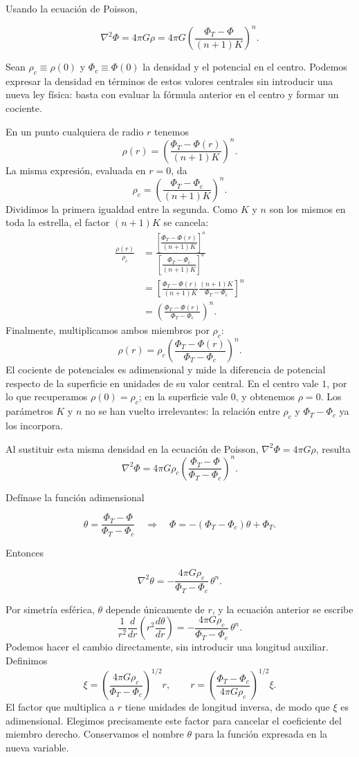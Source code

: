 Usando la ecuación de Poisson,

$$ \nabla^2\Phi = 4\pi G\rho = 4\pi G\left(\frac{\Phi_T - \Phi}{(n+1)K}\right)^n. $$

Sean $\rho_c\equiv\rho(0)$ y $\Phi_c\equiv\Phi(0)$ la densidad y el potencial en el centro. Podemos expresar la densidad en términos de estos valores centrales sin introducir una nueva ley física: basta con evaluar la fórmula anterior en el centro y formar un cociente.

En un punto cualquiera de radio $r$ tenemos
$$
\rho(r)=\left(\frac{\Phi_T-\Phi(r)}{(n+1)K}\right)^n.
$$
La misma expresión, evaluada en $r=0$, da
$$
\rho_c=\left(\frac{\Phi_T-\Phi_c}{(n+1)K}\right)^n.
$$
Dividimos la primera igualdad entre la segunda. Como $K$ y $n$ son los mismos en toda la estrella, el factor $(n+1)K$ se cancela:
$$
\begin{aligned}
\frac{\rho(r)}{\rho_c}
&=\frac{\left[\dfrac{\Phi_T-\Phi(r)}{(n+1)K}\right]^n}
{\left[\dfrac{\Phi_T-\Phi_c}{(n+1)K}\right]^n}\\
&=\left[
\frac{\Phi_T-\Phi(r)}{(n+1)K}
\frac{(n+1)K}{\Phi_T-\Phi_c}
\right]^n\\
&=\left(\frac{\Phi_T-\Phi(r)}{\Phi_T-\Phi_c}\right)^n.
\end{aligned}
$$
Finalmente, multiplicamos ambos miembros por $\rho_c$:
$$
\boxed{\rho(r)=\rho_c
\left(\frac{\Phi_T-\Phi(r)}{\Phi_T-\Phi_c}\right)^n}.
$$
El cociente de potenciales es adimensional y mide la diferencia de potencial respecto de la superficie en unidades de su valor central. En el centro vale $1$, por lo que recuperamos $\rho(0)=\rho_c$; en la superficie vale $0$, y obtenemos $\rho=0$. Los parámetros $K$ y $n$ no se han vuelto irrelevantes: la relación entre $\rho_c$ y $\Phi_T-\Phi_c$ ya los incorpora.

Al sustituir esta misma densidad en la ecuación de Poisson, $\nabla^2\Phi=4\pi G\rho$, resulta
$$
\nabla^2\Phi=4\pi G\rho_c
\left(\frac{\Phi_T-\Phi}{\Phi_T-\Phi_c}\right)^n.
$$

Defínase la función adimensional

$$ \theta = \frac{\Phi_T - \Phi}{\Phi_T - \Phi_c} \quad\Rightarrow\quad \Phi = -(\Phi_T - \Phi_c)\theta + \Phi_T. $$

Entonces

$$ \nabla^2\theta = -\frac{4\pi G\rho_c}{\Phi_T - \Phi_c}\,\theta^n. $$

Por simetría esférica, $\theta$ depende únicamente de $r$, y la ecuación anterior se escribe
$$
\frac{1}{r^2}\frac{d}{dr}\left(r^2\frac{d\theta}{dr}\right)
=-\frac{4\pi G\rho_c}{\Phi_T-\Phi_c}\,\theta^n.
$$
Podemos hacer el cambio directamente, sin introducir una longitud auxiliar. Definimos
$$
\xi=\left(\frac{4\pi G\rho_c}{\Phi_T-\Phi_c}\right)^{1/2}r,
\qquad
r=\left(\frac{\Phi_T-\Phi_c}{4\pi G\rho_c}\right)^{1/2}\xi.
$$
El factor que multiplica a $r$ tiene unidades de longitud inversa, de modo que $\xi$ es adimensional. Elegimos precisamente este factor para cancelar el coeficiente del miembro derecho. Conservamos el nombre $\theta$ para la función expresada en la nueva variable.

